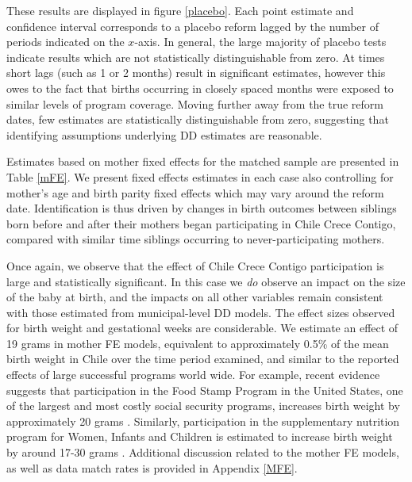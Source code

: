 \documentclass[12pt]{article}
\begin{document}
\begin{spacing}{1.4}
These results are displayed in figure \ref{placebo}.  Each point
estimate and confidence interval corresponds to a placebo reform
lagged by the number of periods indicated on the $x$-axis.  In
general, the large majority of placebo tests indicate results
which are not statistically distinguishable from zero.  At times
short lags (such as 1 or 2 months) result in significant estimates,
however this owes to the fact that births occurring in closely
spaced months were exposed to similar levels of program coverage.
Moving further away from the true reform dates, few estimates
are statistically distinguishable from zero, suggesting that
identifying assumptions underlying DD estimates are reasonable.

Estimates based on mother fixed effects for the matched sample
are presented in Table \ref{mFE}. We present fixed effects
estimates in each case also controlling for mother's age and birth
parity fixed effects which may vary
around the reform date.  Identification is thus driven by changes
in birth outcomes between siblings born before and after their
mothers began participating in Chile Crece Contigo, compared with
similar time siblings occurring to never-participating mothers.


Once again, we observe that the effect of Chile Crece Contigo
participation is large and statistically significant.  In this
case we \emph{do} observe an impact on the size of the baby at
birth, and the impacts on all other variables remain consistent
with those estimated from municipal-level DD models.  The effect
sizes observed for birth weight and gestational weeks are
considerable.  We estimate an effect of 19 grams in mother FE
models, equivalent to approximately 0.5\% of the mean birth
weight in Chile over the time period examined, and similar to the
reported effects of large successful programs world wide.  For
example, recent evidence suggests that participation in the Food
Stamp Program in the United States, one of the largest and most
costly social security programs, increases birth weight by
approximately 20 grams \citep{Almondetal2011}. Similarly,
participation in the supplementary nutrition program for Women,
Infants and Children is estimated to increase birth weight
by around 17-30 grams \citep{Hoynesetal2011,RossinSlater2013}.
Additional discussion related to the mother FE models, as well
as data match rates is provided in Appendix \ref{MFE}.



\end{spacing}
\end{document}
